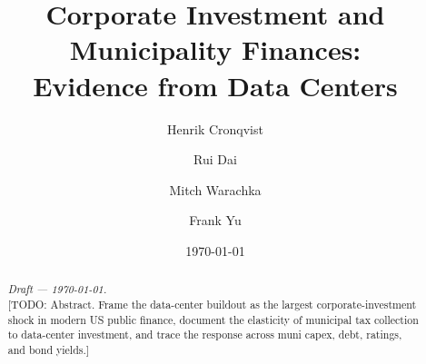 \documentclass[11pt]{article}
\title{Corporate Investment and Municipality Finances:\\
       Evidence from Data Centers}
\author{Henrik Cronqvist \and Rui Dai \and Mitch Warachka \and Frank Yu}
\date{\today}
\begin{document}
\maketitle

\begin{abstract}
\noindent\emph{Draft — \today.}\\[0.5em]
[TODO: Abstract. Frame the data-center buildout as the largest corporate-investment shock in modern US public finance, document the elasticity of municipal tax collection to data-center investment, and trace the response across muni capex, debt, ratings, and bond yields.]
\end{abstract}

\onehalfspacing









\end{document}
